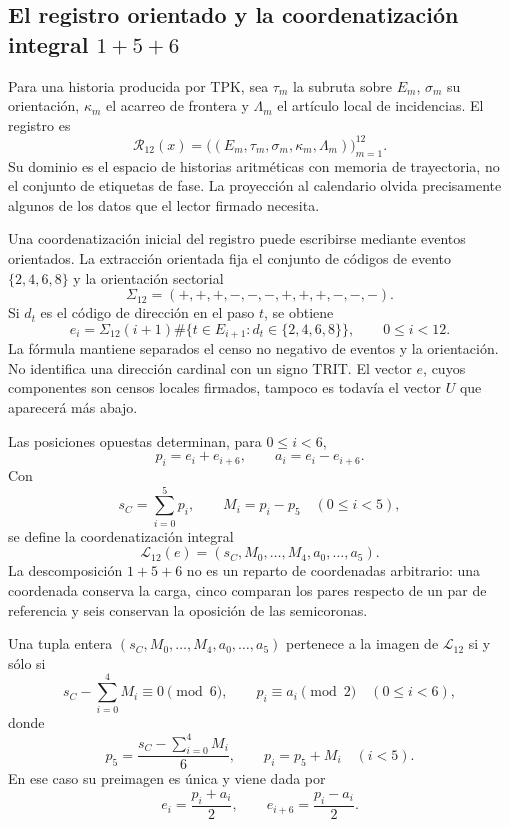 \subsection{El registro orientado y la coordenatización integral \texorpdfstring{\(1+5+6\)}{1+5+6}}
\label{subsec:k-registro-integral}

Para una historia producida por TPK, sea \(\tau_m\) la subruta sobre
\(E_m\), \(\sigma_m\) su orientación, \(\kappa_m\) el acarreo de
frontera y \(\Lambda_m\) el artículo local de incidencias. El registro es
\[
 \mathcal R_{12}(x)=
 \bigl((E_m,\tau_m,\sigma_m,\kappa_m,\Lambda_m)\bigr)_{m=1}^{12}.
\]
Su dominio es el espacio de historias aritméticas con memoria de trayectoria, no el conjunto de
etiquetas de fase. La proyección al calendario olvida precisamente algunos
de los datos que el lector firmado necesita.

Una coordenatización inicial del registro puede escribirse mediante eventos
orientados. La extracción orientada fija el conjunto de códigos de evento
\(\{2,4,6,8\}\) y la orientación sectorial
\[
 \Sigma_{12}=(+,+,+,-,-,-,+,+,+,-,-,-).
\]
Si \(d_t\) es el código de dirección en el paso \(t\), se obtiene
\[
 e_i=\Sigma_{12}(i+1)
 \#\{t\in E_{i+1}:d_t\in\{2,4,6,8\}\},
 \qquad0\leq i<12.
\]
La fórmula mantiene separados el censo no negativo de eventos y la
orientación. No identifica una dirección cardinal con un signo TRIT. El
vector \(e\), cuyos componentes son censos locales firmados, tampoco es
todavía el vector \(U\) que aparecerá más abajo.

Las posiciones opuestas determinan, para \(0\leq i<6\),
\[
 p_i=e_i+e_{i+6},\qquad a_i=e_i-e_{i+6}.
\]
Con
\[
 s_C=\sum_{i=0}^{5}p_i,\qquad M_i=p_i-p_5\quad(0\leq i<5),
\]
se define la coordenatización integral
\[
 \mathcal L_{12}(e)
 =(s_C,M_0,\ldots,M_4,a_0,\ldots,a_5).
\]
La descomposición \(1+5+6\) no es un reparto de coordenadas arbitrario:
una coordenada conserva la carga, cinco comparan los pares respecto de un
par de referencia y seis conservan la oposición de las semicoronas.

\begin{lemma}
\label{lem:k-carta-integral}
Una tupla entera \((s_C,M_0,\ldots,M_4,a_0,\ldots,a_5)\) pertenece a la
imagen de \(\mathcal L_{12}\) si y sólo si
\[
 s_C-\sum_{i=0}^{4}M_i\equiv0\pmod6,
 \qquad p_i\equiv a_i\pmod2\quad(0\leq i<6),
\]
donde
\[
 p_5=\frac{s_C-\sum_{i=0}^{4}M_i}{6},\qquad p_i=p_5+M_i\quad(i<5).
\]
En ese caso su preimagen es única y viene dada por
\[
 e_i=\frac{p_i+a_i}{2},\qquad e_{i+6}=\frac{p_i-a_i}{2}.
\]
\end{lemma}

